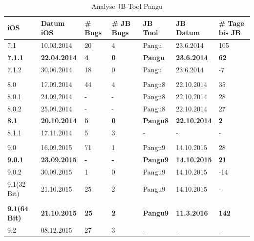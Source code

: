 \begin{table}[hp!]
    \begin{center}
        \begin{tabular}{| p{15mm} | p{20mm} | p{17mm} | p{12mm} | p{20mm} | p{22mm} | p{15mm} |} \hline
            \textbf{iOS} & \textbf{Datum iOS} & \textbf{\# Bugs} & \textbf{\# JB Bugs} & \textbf{JB Tool} & \textbf{JB Datum} & \textbf{\# Tage bis JB} \\ \hline 
7.1 & 10.03.2014 & 20 & 4 & Pangu & 23.6.2014 & 105 \\ \hline
\textbf{7.1.1} & \textbf{22.04.2014} & \textbf{4} & \textbf{0} & \textbf{Pangu} & \textbf{23.6.2014} & \textbf{62} \\ \hline
7.1.2 & 30.06.2014 & 18 & 0 & Pangu & 23.6.2014 & -7 \\ \hline
 & & & & & & \\ \hline
8.0 & 17.09.2014 & 44 & 4 & Pangu8 & 22.10.2014 & 35 \\ \hline
8.0.1 & 24.09.2014 & - & - & Pangu8 & 22.10.2014 & 28 \\ \hline
8.0.2 & 25.09.2014 & - & - & Pangu8 & 22.10.2014 & 27 \\ \hline
\textbf{8.1} & \textbf{20.10.2014} & \textbf{5} & \textbf{0} & \textbf{Pangu8} & \textbf{22.10.2014} & \textbf{2} \\ \hline
8.1.1 & 17.11.2014 & 5 & 3 & - & - & - \\ \hline
 & & & & & & \\ \hline
9.0& 16.09.2015 & 71 & 1 & Pangu9 & 14.10.2015 & 28  \\ \hline
\textbf{9.0.1} & \textbf{23.09.2015} & \textbf{-} & \textbf{-} & \textbf{Pangu9} & \textbf{14.10.2015} & \textbf{21}\\ \hline
9.0.2 & 30.09.2015 & 1 & 0 & Pangu9 & 14.10.2015 & -14 \\ \hline
9.1(32 Bit) & 21.10.2015 & 25 & 2 & Pangu9 & 14.10.2015 & -  \\ \hline
		 & & & & & & \\ \hline				
\textbf{9.1(64 Bit)} & \textbf{21.10.2015} & \textbf{25} & \textbf{2} & \textbf{Pangu9} & \textbf{11.3.2016} & \textbf{142}  \\ \hline
9.2 & 08.12.2015	 & 27 & 3 & - & - & - \\ \hline		
     \end{tabular} 
        \caption{Analyse JB-Tool Pangu \protect\footnotemark}
        \label{tab:AnalysePangu}
    \end{center}
\end{table}

